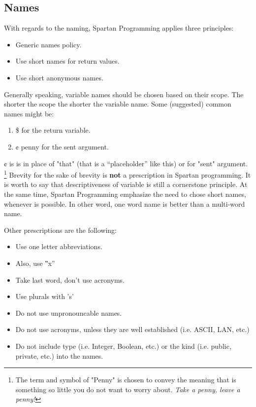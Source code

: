 \subsection{Names}
With regards to the naming, Spartan Programming applies three principles:
\begin{itemize}
 \item Generic names policy.
 \item Use short names for return values.
 \item Use short anonymous names.
\end{itemize}
Generally speaking, variable names should be chosen based on their scope.
The shorter the scope the shorter the variable name.
Some (suggested) common names might be:
\begin{enumerate}
  \item \$ for the return variable.
  \item ¢ penny for the sent argument.
\end{enumerate}
¢ is is in place of "that" (that is a ``placeholder'' like this) or for "sent" argument.
\footnote{The term and symbol of "Penny" is chosen to convey the meaning that is something so little you do not want to worry about.
\emph{Take a penny, leave a penny!}}
Brevity for the sake of brevity is \textbf{not} a prescription in Spartan programming. 
It is worth to say that descriptiveness of variable is still a cornerstone principle. 
At the same time, Spartan Programming emphasize the need to chose short names, whenever is possible.
In other word, one word name is better than a multi-word name.

Other prescriptions are the following:
\begin{itemize}
 \item Use one letter abbreviations.
 \item Also, use ‟x”
 \item Take last word, don't use acronyms.
 \item Use plurals with 's'
 \item Do not use unpronouncable names.
 \item Do not use acronyms, unless they are well established (i.e. ASCII, LAN, etc.)
 \item Do not include type (i.e. Integer, Boolean, etc.) or the kind (i.e. public, private, etc.) into the names.
\end{itemize}

